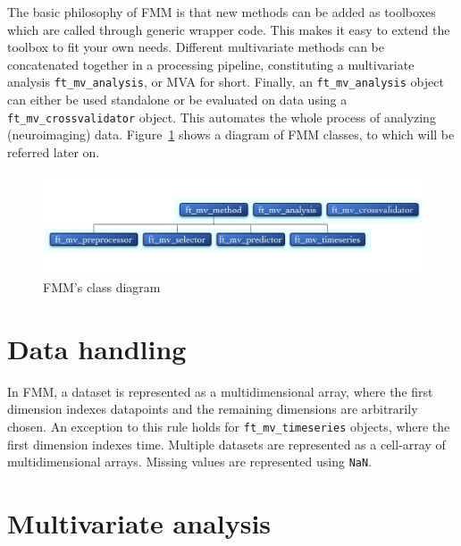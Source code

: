 \documentclass{article}
\renewcommand{\t}[1]{{\tt #1}}
\begin{document}
The basic philosophy of FMM is that new methods can be added as toolboxes which are called through generic wrapper code. This makes it easy to extend the toolbox to fit your own needs. Different multivariate methods can be concatenated together in a processing pipeline, constituting a multivariate analysis \t{ft\_mv\_analysis}, or MVA for short. Finally, an \t{ft\_mv\_analysis} object can either be used standalone or be evaluated on data using a \t{ft\_mv\_crossvalidator} object. This automates the whole process of analyzing (neuroimaging) data. Figure~\ref{class} shows a diagram of FMM classes, to which will be referred later on. 

\begin{figure}[ht]
\begin{center}
\includegraphics[width=\textwidth]{figures/classes.pdf}
\caption{FMM's class diagram}
\end{center}
\label{class}
\end{figure}

\section{Data handling}

In FMM, a dataset is represented as a multidimensional array, where the first dimension indexes datapoints and the remaining dimensions are arbitrarily chosen. An exception to this rule holds for \t{ft\_mv\_timeseries} objects, where the first dimension indexes time. Multiple datasets are represented as a cell-array of multidimensional arrays. Missing values are represented using \t{NaN}.

\section{Multivariate analysis}
\end{document}
